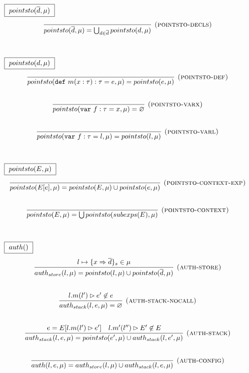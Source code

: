 \documentclass{llncs}
\newcommand{\keywadj}[1]{\mathtt{#1}}
\newcommand{\keyw}[1]{\keywadj{#1}~}
\begin{document}
$\fbox{$~pointsto(\overline{d}, \mu)~$}$
\[
\begin{array}{c}
\infer[\textsc{(pointsto-decls)}]
  {pointsto(\overline{d}, \mu) = \bigcup_{d \in \overline{d}} pointsto(d, \mu)}
  {}\\[5ex]
  
\end{array}
\]

$\fbox{$~pointsto(d, \mu)~$}$
\[
\begin{array}{c}

\infer[\textsc{(pointsto-def)}]
  {pointsto(\keyw{def} m(x:\tau):\tau = e, \mu) = pointsto(e, \mu)}
  {}\\[5ex]
  
\infer[\textsc{(pointsto-varx)}]
  {pointsto(\keyw{var} f:\tau = x,\mu) = \varnothing}
  {}\\[5ex]
\infer[\textsc{(pointsto-varl)}]
  {pointsto(\keyw{var} f:\tau = l,\mu) = pointsto(l,\mu)}
  {}\\[5ex]

\end{array}
\]

$\fbox{$~pointsto(E, \mu)~$}$
\[
\begin{array}{c}
\infer[\textsc{(pointsto-context-exp)}]
  {pointsto(E[e], \mu) = pointsto(E, \mu) \cup pointsto(e, \mu)}
  {}\\[5ex]

\infer[\textsc{(pointsto-context)}]
  {pointsto(E, \mu) = \bigcup pointsto(subexps(E), \mu)}
  {}\\[5ex]

\end{array}
\]

$\fbox{$~auth()~$}$
\[
\begin{array}{c}
\infer[\textsc{(auth-store)}]
  {auth_{store}(l,\mu) = pointsto(l, \mu) \cup pointsto(\overline{d},\mu)}
  {l \mapsto \{ x \Rightarrow \overline{d} \}_{s} \in \mu}\\[5ex]

\infer[\textsc{(auth-stack-nocall)}]
  {auth_{stack}(l,e,\mu) = \varnothing}
  {l.m(l') \rhd e' \not\in e}\\[5ex]
\infer[\textsc{(auth-stack)}]
  {auth_{stack}(l, e, \mu) = pointsto(e',\mu) \cup auth_{stack}(l,e',\mu)}
  {e = E[l.m(l') \rhd e'] & l.m'(l'') \rhd E' \not\in E}\\[5ex]
  
\infer[\textsc{(auth-config)}]
  {auth(l,e, \mu) = auth_{store}(l,\mu) \cup auth_{stack}(l,e,\mu)}
  {}\\[5ex]

\end{array}
\]
\end{document}
